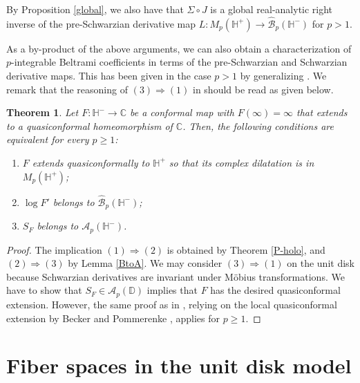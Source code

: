 \documentclass[amstex,12pt,reqno]{amsart}
\newtheorem{theorem}{Theorem}[section]
\theoremstyle{definition}
\begin{document}
By Proposition \ref{global}, we also have that $\Sigma \circ J$ is a global real-analytic right inverse of 
the pre-Schwarzian derivative map $L:M_p(\mathbb H^+) \to \widehat {\mathcal B}_p(\mathbb H^-)$ for $p>1$.

As a by-product of the above arguments, we can also obtain a characterization of 
$p$-integrable Beltrami coefficients in terms of the pre-Schwarzian and Schwarzian derivative maps.
This has been given in the case $p>1$ by generalizing \cite[Theorem 4.4]{STW}.
We remark that the reasoning of $(3) \Rightarrow (1)$ in \cite[Theorem 7.1]{WM-4} should be read as given below.

\begin{theorem}\label{conformal}
Let $F:\mathbb H^- \to \mathbb C$ be a conformal map with $F(\infty)=\infty$ that extends to a quasiconformal
homeomorphism of $\mathbb C$.
Then, the following conditions are equivalent for every $p \geq 1$:
\begin{enumerate}
\item
$F$ extends quasiconformally to $\mathbb H^+$ so that its complex dilatation is in $M_p(\mathbb H^+)$;
\item
$\log F'$ belongs to $\widehat{\mathcal B}_p(\mathbb H^-)$;
\item
$S_F$ belongs to ${\mathcal A}_p(\mathbb H^-)$.
\end{enumerate}
\end{theorem}

\begin{proof}
The implication $(1) \Rightarrow (2)$ is obtained by Theorem \ref{P-holo}, and
$(2) \Rightarrow (3)$ by Lemma \ref{BtoA}. 
We may consider $(3) \Rightarrow (1)$ on the unit disk because Schwarzian derivatives are
invariant under M\"obius transformations.
We have to show that
$S_F \in {\mathcal A}_p(\mathbb D)$ implies that $F$ has the desired quasiconformal extension.
However, the same proof as in \cite[Theorem 2]{Cu}, 
relying on the local quasiconformal extension by Becker and Pommerenke \cite[Satz 4]{BP}, 
applies for $p \geq 1$.
\end{proof}



\section{Fiber spaces in the unit disk model}\label{4}
\end{document}
